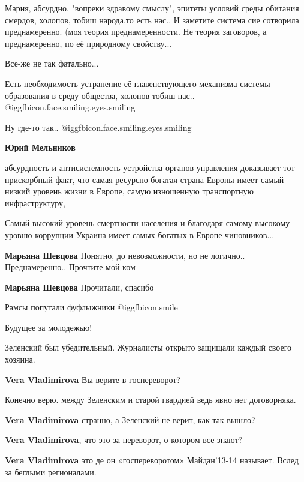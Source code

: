 \begin{itemize}
\begin{itemize}
Мария, абсурдно, "вопреки здравому смыслу", эпитеты условий среды обитания
смердов, холопов, тобиш народа,то есть нас.. И заметите система сие сотворила
преднамеренно. (моя теория преднамеренности. Не теория заговоров, а
преднамеренно, по её природному свойству...

Все-же не так фатально...

Есть необходимость устранение её главенствующего механизма системы образования
в среду общества, холопов тобиш нас..  @igg{fbicon.face.smiling.eyes.smiling} 

Ну где-то так..  @igg{fbicon.face.smiling.eyes.smiling} 

\textbf{Юрий Мельников} 

абсурдность и антисистемность устройства органов управления доказывает тот
прискорбный факт, что самая ресурсно богатая страна Европы имеет самый низкий
уровень жизни в Европе, самую изношенную транспортную инфраструктуру,

Самый высокий уровень смертности населения и благодаря самому высокому уровню
коррупции Украина имеет самых богатых в Европе чиновников...

\textbf{Марьяна Шевцова}
Понятно, до невозможности, но не логично..
Преднамеренно..
Прочтите мой ком

\textbf{Марьяна Шевцова}
Прочитали, спасибо

\end{itemize} %

Рамсы попутали фуфлыжники  @igg{fbicon.smile} 

Будущее за молодежью!

Зеленский был убедительный. Журналисты открыто защищали каждый своего хозяина.

\begin{itemize} %
\textbf{Vera Vladimirova} Вы верите в госпереворот?

Конечно верю. между Зеленским и старой гвардией ведь явно нет договорняка.

\textbf{Vera Vladimirova} странно, а Зеленский не верит, как так вышло?

\textbf{Vera Vladimirova}, что это за переворот, о котором все знают?

\textbf{Vera Vladimirova} это де он «госпереворотом» Майдан’13-14 называет. Вслед за беглыми регионалами.
\end{itemize} %


\end{itemize}
